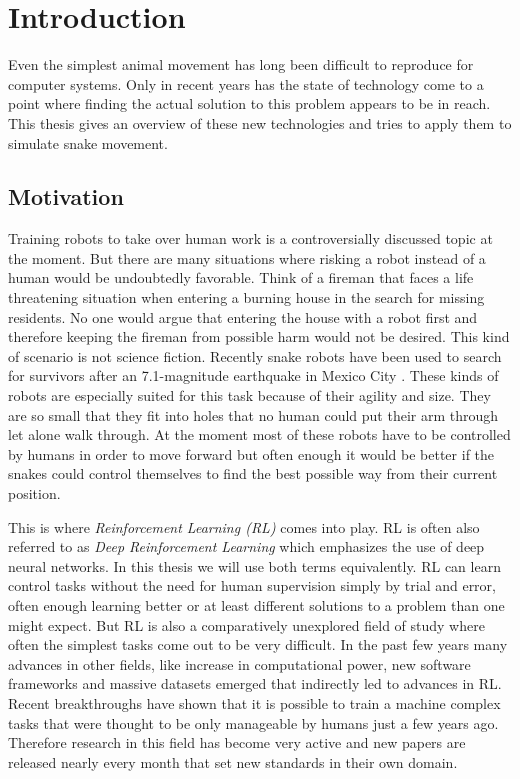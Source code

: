 \chapter{Introduction}
\label{section:Introduction}

Even the simplest animal movement has long been difficult to reproduce for computer systems.
Only in recent years has the state of technology come to a point where finding the actual solution to this problem appears to be in reach.
This thesis gives an overview of these new technologies and tries to apply them to simulate snake movement.

\section{Motivation}

Training robots to take over human work is a controversially discussed topic at the moment.
But there are many situations where risking a robot instead of a human would be undoubtedly favorable.
Think of a fireman that faces a life threatening situation when entering a burning house in the search for missing residents.
No one would argue that entering the house with a robot first and therefore keeping the fireman from possible harm would not be desired.
This kind of scenario is not science fiction.
Recently snake robots have been used to search for survivors after an 7.1-magnitude earthquake in Mexico City \cite{cmu_snake_robots_mexico}.
These kinds of robots are especially suited for this task because of their agility and size.
They are so small that they fit into holes that no human could put their arm through let alone walk through.
At the moment most of these robots have to be controlled by humans in order to move forward but often enough it would be better if the snakes could control themselves to find the best possible way from their current position.


This is where \emph{Reinforcement Learning (RL)} comes into play.
RL is often also referred to as \emph{Deep Reinforcement Learning} which emphasizes the use of deep neural networks.
In this thesis we will use both terms equivalently.
RL can learn control tasks without the need for human supervision simply by trial and error, often enough learning better or at least different solutions to a problem than one might expect.
But RL is also a comparatively unexplored field of study where often the simplest tasks come out to be very difficult.
In the past few years many advances in other fields, like increase in computational power, new software frameworks and massive datasets emerged that indirectly led to advances in RL.
Recent breakthroughs have shown that it is possible to train a machine complex tasks that were thought to be only manageable by humans just a few years ago.
Therefore research in this field has become very active and new papers are released nearly every month that set new standards in their own domain.


